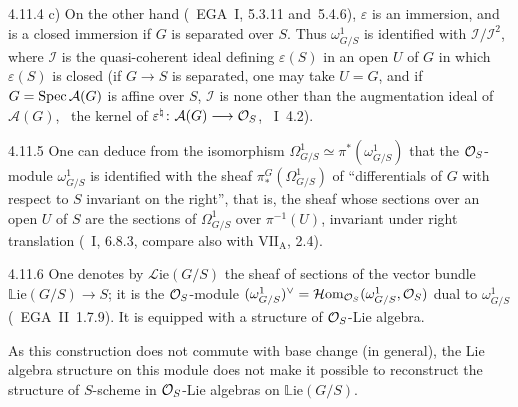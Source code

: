 \begin{remarks}{4.11.4}
c) On the other hand (\cf\ EGA~I, 5.3.11 and~5.4.6), \(\varepsilon\) is an
immersion, and is a closed immersion if \(G\) is separated over \(S\). Thus
\(\omega^1_{G/S}\) is identified with \(\mathcal{I}/\mathcal{I}^2\), where
\(\mathcal{I}\) is the quasi-coherent ideal defining \(\varepsilon(S)\) in an
open \(U\) of \(G\) in which \(\varepsilon(S)\) is closed (if \(G\to S\) is
separated, one may take \(U=G\), and if \(G=\operatorname{Spec}\mathcal{A}(G)\) is affine
over \(S\), \(\mathcal{I}\) is none other than the augmentation ideal of
\(\mathcal{A}(G)\), \ie\ the kernel of
\(\varepsilon^{\natural}\colon\mathcal{A}(G)\longrightarrow\mathcal{O}_S\), \cf~I~4.2).%
{\renewcommand{\thefootnote}{(88)}}
\end{remarks}

\begin{remark}{4.11.5}
\label{II.4.11.5}
One can deduce from the isomorphism
\(\Omega^1_{G/S}\simeq\pi^*(\omega^1_{G/S})\) that the \(\mathcal{O}_S\)-module
\(\omega^1_{G/S}\) is identified with the sheaf
\(\pi^G_*(\Omega^1_{G/S})\) of ``differentials of \(G\) with respect to \(S\)
invariant on the right'', that is, the sheaf whose sections over an open
\(U\) of \(S\) are the sections of \(\Omega^1_{G/S}\) over \(\pi^{-1}(U)\),
invariant under right translation (\cf~I, 6.8.3, compare also with
\(\mathrm{VII}_{\mathrm{A}}\), 2.4).%
{\renewcommand{\thefootnote}{(89)}}
\end{remark}

\begin{notation}{4.11.6}
\label{II.4.11.6}
One denotes by \(\mathcal{L}\mathrm{ie}(G/S)\) the sheaf of sections of the
vector bundle \(\mathbb{L}\mathrm{ie}(G/S)\to S\); it is the \(\mathcal{O}_S\)-module
\((\omega^1_{G/S})^{\vee}
=\mathcal{H}\mathrm{om}_{\mathcal{O}_S}(\omega^1_{G/S},\mathcal{O}_S)\) dual to
\(\omega^1_{G/S}\) (\cf\ EGA~II~1.7.9). It is equipped with a structure of
\(\mathcal{O}_S\)-Lie algebra.

As this construction does not commute with base change (in general), the
Lie algebra structure on this module does not make it possible to reconstruct
the structure of \(S\)-scheme in \(\mathcal{O}_S\)-Lie algebras on
\(\mathbb{L}\mathrm{ie}(G/S)\).%
{\renewcommand{\thefootnote}{(90)}}
\end{notation}

